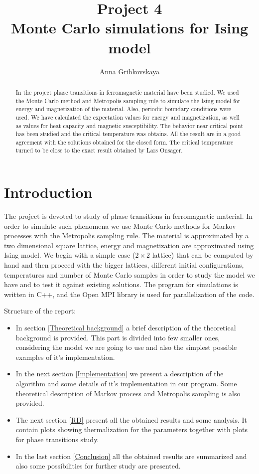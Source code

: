 \documentclass[a4paper]{article}
\title{Project 4\\ Monte Carlo simulations for Ising model}
\author{Anna Gribkovskaya}
\begin{document}
\maketitle

\begin{abstract}
In the project phase transitions in ferromagnetic material have been studied. We used the Monte Carlo method and Metropolis sampling rule to simulate the Ising model for energy and magnetization of the material. Also, periodic boundary conditions were used. We have calculated the expectation values for energy and magnetization, as well as values for heat capacity and magnetic susceptibility. The behavior near critical point has been studied and the critical temperature was obtains. All the result are in a good agreement with the solutions obtained for the closed form. The critical temperature turned to be close to the exact result obtained by Lars Onsager. 

\end{abstract}

\section*{Introduction}
The project is devoted to study of phase transitions in ferromagnetic material. In order to simulate such phenomena we use Monte Carlo methods for Markov processes with the Metropolis sampling rule. The material is approximated by a two dimensional square lattice, energy and magnetization are approximated using Ising model. We begin with a simple case ($2 \times 2$ lattice) that can be computed by hand and then proceed with the bigger lattices, different initial configurations, temperatures and number of Monte Carlo samples in order to study the model we have and to test it against existing solutions. The program for simulations is written in C++, and the Open MPI library is used for parallelization of the code.

Structure of the report:
\begin{itemize}
\item In section  \ref{Theoretical background} a brief description of the theoretical background is provided. This part is divided into few smaller ones, considering the model we are going to use and also the simplest possible examples of it's implementation.
\item In the next section \ref{Implementation} we present a description of the algorithm and some details of it's implementation in our program. Some theoretical description of Markov process and Metropolis sampling is also provided.
\item The next section \ref{RD} present all the obtained results and some analysis. It contain plots showing thermalization for the parameters together with plots for phase transitions study. 
\item In the last section \ref{Conclusion} all the obtained results are summarized and also some possibilities for further study are presented.
\end{itemize}
\end{document}
